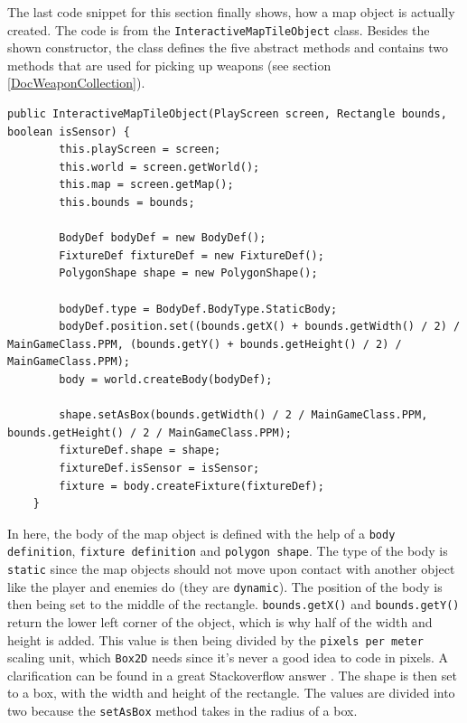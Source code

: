 \documentclass[12p]{article}
\begin{document}
The last code snippet for this section finally shows, how a map object is actually created. The code is from the \texttt{InteractiveMapTileObject} class. Besides the shown constructor, the class defines the five abstract methods and contains two methods that are used for picking up weapons (see section \ref{DocWeaponCollection}).

\begin{verbatim}
public InteractiveMapTileObject(PlayScreen screen, Rectangle bounds, boolean isSensor) {
        this.playScreen = screen;
        this.world = screen.getWorld();
        this.map = screen.getMap();
        this.bounds = bounds;

        BodyDef bodyDef = new BodyDef();
        FixtureDef fixtureDef = new FixtureDef();
        PolygonShape shape = new PolygonShape();

        bodyDef.type = BodyDef.BodyType.StaticBody;
        bodyDef.position.set((bounds.getX() + bounds.getWidth() / 2) / MainGameClass.PPM, (bounds.getY() + bounds.getHeight() / 2) / MainGameClass.PPM);
        body = world.createBody(bodyDef);

        shape.setAsBox(bounds.getWidth() / 2 / MainGameClass.PPM, bounds.getHeight() / 2 / MainGameClass.PPM);
        fixtureDef.shape = shape;
        fixtureDef.isSensor = isSensor;
        fixture = body.createFixture(fixtureDef);
    }
\end{verbatim}

In here, the body of the map object is defined with the help of a \texttt{body definition}, \texttt{fixture definition} and \texttt{polygon shape}. The type of the body is \texttt{static} since the map objects should not move upon contact with another object like the player and enemies do (they are \texttt{dynamic}). The position of the body is then being set to the middle of the rectangle. \texttt{bounds.getX()} and \texttt{bounds.getY()} return the lower left corner of the object, which is why half of the width and height is added. This value is then being divided by the \texttt{pixels per meter} scaling unit, which \texttt{Box2D} needs since it's never a good idea to code in pixels. A clarification can be found in a great Stackoverflow answer \cite{stackoverflowPPM}. The shape is then set to a box, with the width and height of the rectangle. The values are divided into two because the \texttt{setAsBox} method takes in the radius of a box.

\end{document}
